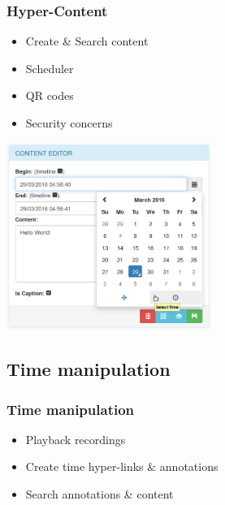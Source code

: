 \documentclass[compress]{beamer}
\begin{document}
		\begin{frame}[c]
		\frametitle{Hyper-Content}


		\begin{itemize}
			\item Create \& Search content \vfill
			\item Scheduler \vfill
			\item QR codes \vfill
			\item Security concerns
		\end{itemize}

		\begin{flushright}

			\vspace*{-11\baselineskip}
			\includegraphics[width=0.5\textwidth]{figures/edition.png}
		\end{flushright}
		

		\end{frame}


\subsection{Time manipulation}

		\begin{frame}[c]
		\frametitle{Time manipulation}


		\begin{itemize}
		\item Playback recordings
		\vfill
		\item Create time hyper-links \& annotations
		\vfill
		\item Search annotations \& content
		\vfill
		\end{itemize}

		

		\end{frame}
\end{document}
